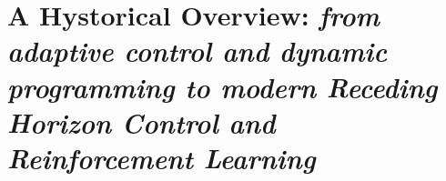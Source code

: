 \section{A Hystorical Overview: \textnormal{\textit{from adaptive control and dynamic programming to modern Receding Horizon Control and Reinforcement Learning}}}
\cite{rl:bellman1957markovian}
\cite{rl:bellman1960dynamic}
\cite{rl:rumelhart1986learning}
\cite{rl:kakade2001natural}
\cite{rl:peters2005natural}
\cite{rl:degris2012off}
\cite{rl:schulman2015trust}
\cite{rl:schulman2017proximal}
\cite{rl:pardo2018time}
\cite{rl:haarnoja2018soft}
\cite{rl:makoviychuk2021isaac}
\cite{rl:rudin2022learning}
\cite{rl:schneider2023learning}
\cite{rl:mujocoaccelereted2023}
\cite{rl:miki2024learning}

\cite{frameworks::horizon_to}

\cite{web::lrhc_boston_dyn}
\cite{frameworks:mittal2023orbit}
\cite{frameworks:howell2022}
\cite{mpc_learn:hewing2020learning}